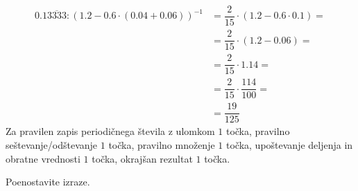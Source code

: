\documentclass[addpoints]{exam}
\begin{document}
\begin{questions}
\begin{parts}
        \begin{solution}[4cm]
            \begin{align*}
                0.1\overline{3333}:\left(1.2-0.6\cdot\left(0.04+0.06\right)\right)^{-1} &= \dfrac{2}{15}\cdot \left(1.2-0.6\cdot 0.1\right)= \\
                                                                                        &= \dfrac{2}{15}\cdot \left(1.2-0.06\right)= \\
                                                                                        &= \dfrac{2}{15}\cdot 1.14= \\
                                                                                        &= \dfrac{2}{15}\cdot \dfrac{114}{100}= \\
                                                                                        &= \dfrac{19}{125}
            \end{align*}
            Za pravilen zapis periodičnega števila z ulomkom $1$ točka, pravilno seštevanje/odštevanje $1$ točka, pravilno množenje $1$ točka, upoštevanje deljenja in obratne vrednosti $1$ točka, okrajšan rezultat $1$ točka.
        \end{solution}

    \end{parts}








        \question
        Poenostavite izraze.
\end{questions}
\end{document}
